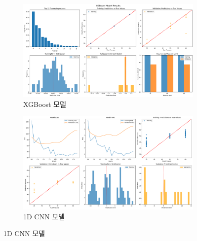 \documentclass[12pt,a4paper]{article}
\begin{document}
\begin{figure}[H]
    \centering
    \begin{subfigure}[b]{0.45\textwidth}
        \includegraphics[width=\textwidth]{images/XGBoost.png}
        \caption{XGBoost 모델}
        \label{fig:xgboost_result}
    \end{subfigure}
    \hfill
    \begin{subfigure}[b]{0.45\textwidth}
        \includegraphics[width=\textwidth]{images/1DCNN.png}
        \caption{1D CNN 모델}
        \label{fig:1dcnn_result}
    \end{subfigure}
    

\end{figure}
\end{document}
